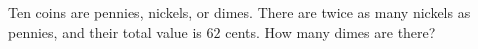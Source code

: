 Ten coins are pennies, nickels, or dimes. There are twice as many nickels as pennies, and their total value is $62$ cents. How many dimes are there?
